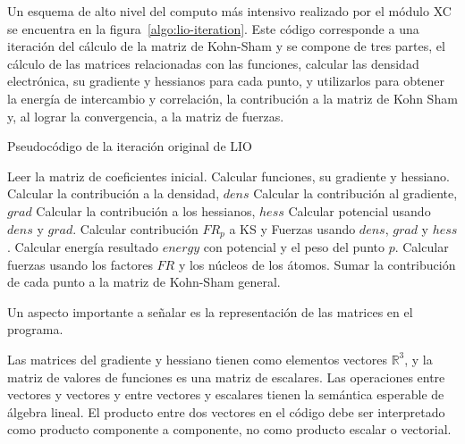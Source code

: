 Un esquema de alto nivel del computo m\'as intensivo realizado por el m\'odulo
XC se encuentra en la figura~\ref{algo:lio-iteration}. Este c\'odigo corresponde
a una iteraci\'on del c\'alculo de la matriz de Kohn-Sham y se compone de tres
partes, el c\'alculo de las matrices relacionadas con las funciones, calcular las
densidad electr\'onica, su gradiente y hessianos para cada punto, y utilizarlos
para obtener la energ\'ia de intercambio y correlaci\'on, la contribuci\'on a
la matriz de Kohn Sham y, al lograr la convergencia, a la matriz de fuerzas.

\begin{algorithm}[H]
        \caption{Pseudoc\'odigo de la iteraci\'on original de LIO}
        \label{algo:lio-iteration}
        \begin{algorithmic}
              \State Leer la matriz de coeficientes inicial.
              \State Calcular funciones, su gradiente y hessiano.
                       \State Calcular la contribuci\'on a la densidad, $dens$
                       \State Calcular la contribuci\'on al gradiente, $grad$
                       \State Calcular la contribuci\'on a los hessianos, $hess$
                  \EndFor
                  \State Calcular potencial usando $dens$ y $grad$.
                  \State Calcular contribuci\'on $FR_p$ a KS y Fuerzas usando $dens$, $grad$ y $hess$.
                  \State Calcular energ\'ia resultado $energy$ con potencial y el peso del punto $p$.
              \EndFor
              \State Calcular fuerzas usando los factores $FR$ y los n\'ucleos de los \'atomos.
              \State Sumar la contribuci\'on de cada punto a la matriz de Kohn-Sham general.
            \EndFunction
        \end{algorithmic}
\end{algorithm}

Un aspecto importante a se\~nalar es la representaci\'on de las matrices en el
programa.

Las matrices del gradiente y hessiano tienen como elementos vectores $\mathbb{R}^3$, y
la matriz de valores de funciones es una matriz de escalares. Las operaciones entre
vectores y vectores y entre vectores y escalares tienen la sem\'antica esperable de \'algebra
lineal. El producto entre dos vectores en el c\'odigo debe ser interpretado como producto
componente a componente, no como producto escalar o vectorial.

